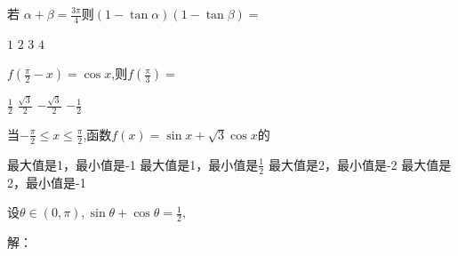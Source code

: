 \documentclass[12pt,answers]{exam}
\begin{document}
\begin{questions}
\question 
若 $\displaystyle \alpha+\beta=\frac{3\pi}{4}$则$(1-\tan\alpha)(1-\tan\beta)=$\fillin[B]\\
\begin{oneparchoices}
\choice $1$  
\choice $2$
\choice $3$
\choice $4$
\end{oneparchoices}

\question 
$\displaystyle f(\frac{\pi}{2}-x)=\cos{x}$,则$\displaystyle f(\frac{\pi}{3})=$\fillin[B] \\
\begin{oneparchoices}
\choice $\displaystyle \frac{1}{2}$  
\choice $\displaystyle \frac{\sqrt{3}}{2}$
\choice $\displaystyle -\frac{\sqrt{3}}{2}$
\choice $\displaystyle -\frac{1}{2}$
\end{oneparchoices}
\question 
当$\displaystyle -\frac{\pi}{2}\le x\le \frac{\pi}{2}$,函数$f(x)=\sin{x}+\sqrt{3}\cos{x}$的\fillin[D]
\begin{choices}
\choice 最大值是1，最小值是-1  
\choice 最大值是1，最小值是$\displaystyle \frac{1}{2}$
\choice 最大值是2，最小值是-2
\choice 最大值是2，最小值是-1
\end{choices}

\question
设$\displaystyle \theta\in(0,\pi),\sin\theta+\cos\theta=\frac{1}{2},$
解：
\end{questions}
\end{document}
